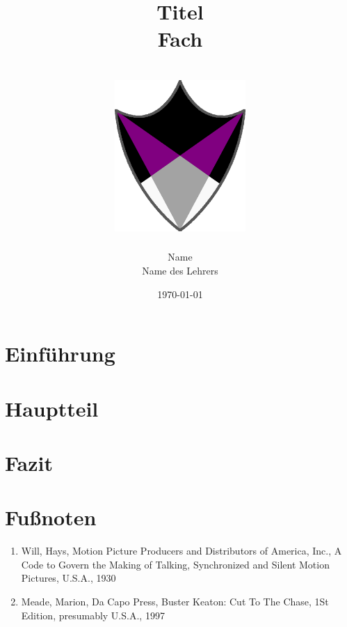 \documentclass[11pt,a4paper]{article}
\title{
      {Titel}\\
      {Fach}\\
      {\hrulefill}\\
      {\vspace{1cm}}
      {\includegraphics[width=50mm,scale=1]{aceing_shield.png}}\\
      {\hrulefill}
      }
\author{Name\\Name des Lehrers}
\date{\today}
\begin{document}
\pagestyle{fancy}
\fancyhead{}
\fancyfoot[C]{\thepage}
\renewcommand{\headrulewidth}{1pt}
\renewcommand{\footrulewidth}{1pt}

\newcommand{\fakesection}[1]{%
  \par\refstepcounter{section}%
  \sectionmark{#1}%
  \addcontentsline{toc}{section}{\protect\numberline{\thesection}#1}%
}

\newcommand{\fakesubsection}[1]{%
  \par\refstepcounter{subsection}%
  \sectionmark{#1}%
  \addcontentsline{toc}{subsection}{\protect\numberline{\thesubsection}#1}%
}

\onehalfspacing
\maketitle
\thispagestyle{empty}
\newpage
\tableofcontents
\thispagestyle{empty}
\newpage


\section{Einführung}

\clearpage

\section{Hauptteil}

\clearpage

\section{Fazit}

\clearpage

\section{Fußnoten}

\renewcommand{\labelenumi}{\alph{enumi})} %
\begin{enumerate}
\item Will, Hays, Motion Picture Producers and Distributors of America, Inc., A Code to Govern the Making of Talking, Synchronized and Silent Motion Pictures, U.S.A., 1930
\item Meade, Marion,‎ Da Capo Press, Buster Keaton: Cut To The Chase, 1St Edition, presumably U.S.A., 1997
\end{enumerate}
\end{document}
